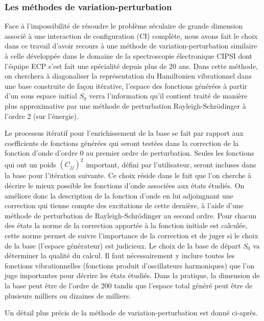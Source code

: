 \subsubsection{Les méthodes de variation-perturbation}


Face à l’impossibilité de résoudre le problème séculaire de grande dimension associé à une interaction de configuration (CI) complète, nous avons fait le choix dans  ce travail d’avoir recours à une méthode de variation-perturbation similaire à celle développée dans le domaine de la spectroscopie électronique CIPSI \cite{huron1973iterative} dont l’équipe ECP s’est fait une spécialité depuis plus de 20 ans. Dans cette méthode, on cherchera à diagonaliser la représentation du Hamiltonien vibrationnel dans une base construite de façon itérative, l’espace des fonctions générées à partir d’un sous espace initial $S_0$ verra l’information qu’il contient traité de manière plus approximative par une méthode de perturbation Rayleigh-Schrödinger à l’ordre 2 (sur l’énergie).

Le processus itératif pour l’enrichissement de la base se fait par rapport aux coefficients de fonctions générées qui seront testées dans la correction de la fonction d’onde d’ordre 0 au premier ordre de perturbation. Seules les fonctions qui ont un poids $(C_{jj})^2$ important, défini par l’utilisateur, seront incluses dans la base pour l’itération suivante. 
Ce choix réside dans le fait que l’on cherche à décrire le mieux possible les fonctions d’onde associées aux états étudiés. On améliore donc la description de la fonction  d’onde en lui adjoingnant une correction qui tienne compte des excitations de cette dernière, à l’aide d’une méthode de perturbation de Rayleigh-Schrödinger au second ordre. Pour chacun des états la norme de la correction apportée à la fonction initiale est calculée, cette norme permet de suivre l’importance de la correction et de juger si le choix de la base (l’espace générateur) est judicieux. Le choix de la base de départ $S_0$ va déterminer la qualité du calcul. Il faut nécessairement y inclure toutes les fonctions vibrationnelles (fonctions produit d’oscillateurs harmoniques) que l’on juge importantes pour décrire les états étudiés. Dans la pratique, la dimension de la base peut être de l’ordre de 200 tandis que l’espace total généré peut être de plusieurs milliers ou dizaines de milliers.

Un détail plus précis de la méthode de variation-perturbation est donné ci-après.

